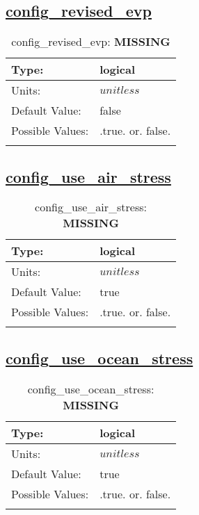 \subsection[config\_revised\_evp]{\hyperref[sec:nm_tab_velocity_solver]{config\_revised\_evp}}
\label{subsec:nm_sec_config_revised_evp}
\begin{center}
\begin{longtable}{| p{2.0in} || p{4.0in} |}
    \hline
    Type: & logical \\
    \hline
    Units: & $unitless$ \\
    \hline
    Default Value: & false \\
    \hline
    Possible Values: & .true. or. false. \\
    \hline
    \caption{config\_revised\_evp: {\bf \color{red} MISSING}}
\end{longtable}
\end{center}
\subsection[config\_use\_air\_stress]{\hyperref[sec:nm_tab_velocity_solver]{config\_use\_air\_stress}}
\label{subsec:nm_sec_config_use_air_stress}
\begin{center}
\begin{longtable}{| p{2.0in} || p{4.0in} |}
    \hline
    Type: & logical \\
    \hline
    Units: & $unitless$ \\
    \hline
    Default Value: & true \\
    \hline
    Possible Values: & .true. or. false. \\
    \hline
    \caption{config\_use\_air\_stress: {\bf \color{red} MISSING}}
\end{longtable}
\end{center}
\subsection[config\_use\_ocean\_stress]{\hyperref[sec:nm_tab_velocity_solver]{config\_use\_ocean\_stress}}
\label{subsec:nm_sec_config_use_ocean_stress}
\begin{center}
\begin{longtable}{| p{2.0in} || p{4.0in} |}
    \hline
    Type: & logical \\
    \hline
    Units: & $unitless$ \\
    \hline
    Default Value: & true \\
    \hline
    Possible Values: & .true. or. false. \\
    \hline
    \caption{config\_use\_ocean\_stress: {\bf \color{red} MISSING}}
\end{longtable}
\end{center}
